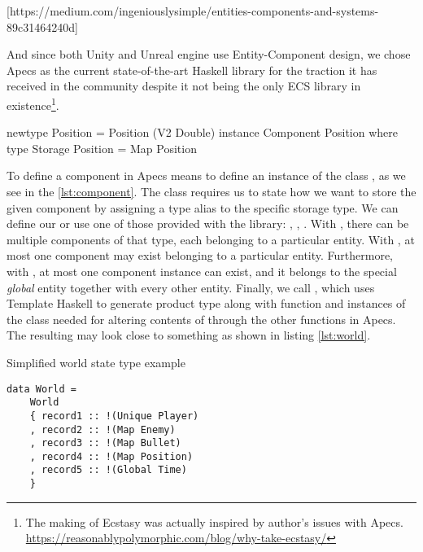 \documentclass[
  digital, %
  color,   %
  table,   %
  oneside, %
  lof,     %
  lot,     %
]{fithesis3}
\begin{document}
[https://medium.com/ingeniouslysimple/entities-components-and-systems-89c31464240d]

And since both Unity and Unreal engine use Entity-Component design,
we chose Apecs as the current state-of-the-art Haskell library
for the traction it has received in the community despite
it not being the only ECS library in existence\footnote{
The making of Ecstasy was actually inspired by author's issues with Apecs. \\
\url{https://reasonablypolymorphic.com/blog/why-take-ecstasy/}
}.

\begin{listing}
\label{lst:component}
\caption{Defining instance for \lstinline{Component}}
\begin{haskell}
newtype Position = Position (V2 Double)
instance Component Position where
    type Storage Position = Map Position
\end{haskell}
\end{listing}

To define a component in Apecs means to define an instance of the class ,
as we see in the \ref{lst:component}.
The  class
requires us to state how we want to store the given component
by assigning a type alias to the specific storage type.
We can define our  or use one of those provided
with the library: , , .
With , there can be multiple components of that type,
each belonging to a particular entity.
With , at most one component may exist
belonging to a particular entity. Furthermore,
with , at most one component instance can exist,
and it belongs to the special \emph{global} entity together
with every other entity. Finally, we call ,
which uses Template Haskell to generate  product type
along with  function and instances of the 
class needed for altering contents of  through
the other functions in Apecs. The resulting 
may look close to something as shown in listing \ref{lst:world}.

\begin{listing}
\label{lst:world}
\caption{Simplified world state type example}
\begin{verbatim}
data World =
    World
    { record1 :: !(Unique Player)
    , record2 :: !(Map Enemy)
    , record3 :: !(Map Bullet)
    , record4 :: !(Map Position)
    , record5 :: !(Global Time)
    }
\end{verbatim}
\end{listing}
\end{document}
